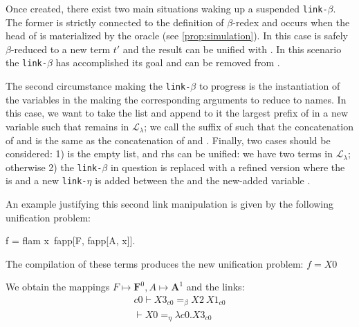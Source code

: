 \documentclass[sigconf,natbib=false,review]{acmart}
\newcommand{\llambda}{\ensuremath{\mathcal{L}_\lambda}\xspace}
\newcommand{\linkbeta}{\texttt{link-}\ensuremath{\beta}\xspace}
\newcommand{\linketa}{\texttt{link-}\ensuremath{\eta}\xspace}
\newcommand{\linketaM}[3]{\ensuremath{#1 \vdash #2 =_\eta #3}}
\newcommand{\linkbetaM}[3]{\ensuremath{#1 \vdash #2 =_\beta #3}}
\newcommand{\mapping}[3]{\ensuremath{#1 \mapsto #2^#3}}
\begin{document}
Once created, there exist two main situations waking up a suspended \linkbeta.
The former is strictly connected to the definition of $\beta$-redex and occurs
when the head of \rhs is materialized by the oracle (see
\cref{prop:simulation}). In this case \rhs is safely
$\beta$-reduced to a new term $t'$ and the result can be unified with \lhs. In
this scenario the \linkbeta has accomplished its goal and can be removed from
\linkStore.

The second circumstance making the \linkbeta to progress is the instantiation of
the variables in the  making the corresponding arguments to
reduce to names. In this case, we want to take the list  and
append to it the largest prefix of  in a new variable
 such that  remains in \llambda; we call
 the suffix of  such that the concatenation of
 and  is the same as the concatenation of
 and . Finally, two cases should be considered: 1)
 is the empty list, \lhs and rhs can be unified: we have two
terms in \llambda; otherwise 2) the \linkbeta in question is replaced with a
refined version where the \rhs is   and a new
\linketa is added between the \lhs and the new-added variable .

An example justifying this second  link manipulation is given by the following
unification problem:

\def\varF{\ensuremath{\textbf{F}}\xspace}
\def\varA{\ensuremath{\textbf{A}}\xspace}
\def\varB{\ensuremath{\textbf{B}}\xspace}

\begin{elpicode}
  f = flam x\ fapp[F, fapp[A, x]].
\end{elpicode}


The compilation of these terms produces the new unification problem: $f = X0$

We obtain the mappings $\mapping{F}{\varF}{0}, \mapping{A}{\varA}{1}$ and the links:
%
\begin{gather}
  \linkbetaM{c0}{X3_{c0}}{X2~X1_{c0}}\\
  \linketaM{}{X0}{\lambda c0.X3_{c0}}
\end{gather}
\end{document}
